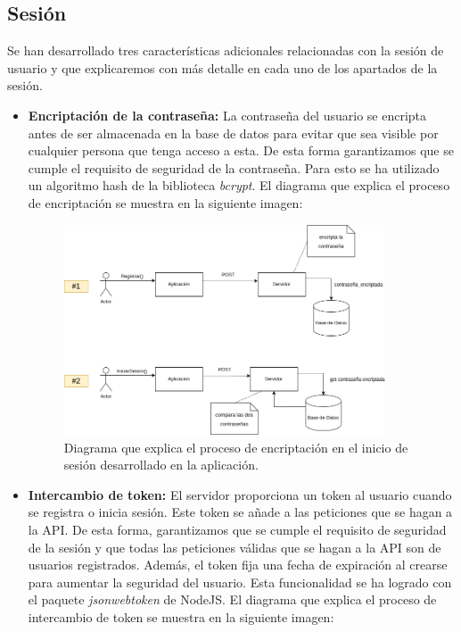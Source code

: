 \subsection{Sesión}
\label{sec:sesion}
Se han desarrollado tres características adicionales relacionadas con la sesión de usuario y que explicaremos con más detalle en cada uno de los apartados de la sesión.
\begin{itemize}
    \item \textbf{Encriptación de la contraseña:} La contraseña del usuario se encripta antes de ser almacenada en la base de datos para evitar que sea
     visible por cualquier persona que tenga acceso a esta. De esta forma garantizamos que se cumple el requisito de seguridad de la contraseña. 
     Para esto se ha utilizado un algoritmo hash de la biblioteca \textit{bcrypt}.
    El diagrama que explica el proceso de encriptación se muestra en la siguiente imagen:
    \begin{figure}[H]
      \centering
      \includegraphics[width=0.9\textwidth]{imagenes/c7/logindiag.png}
      \caption{Diagrama que explica el proceso de encriptación en el inicio de sesión desarrollado en la aplicación.}
      \label{fig:login}
    \end{figure}

    \item \textbf{Intercambio de token:} El servidor proporciona un token al usuario cuando se registra o inicia sesión. Este token se añade a las peticiones 
    que se hagan a la API. De esta forma, garantizamos que se cumple el requisito de seguridad de la sesión y 
    que todas las peticiones válidas que se hagan a la API son de usuarios registrados. Además, el token fija una fecha de expiración al crearse para aumentar
     la seguridad del usuario. Esta funcionalidad se ha logrado con el paquete \textit{jsonwebtoken} de NodeJS.
    El diagrama que explica el proceso de intercambio de token se muestra en la siguiente imagen:


\end{itemize}

